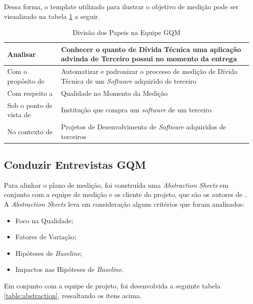 Dessa forma, o template utilizado para ilustrar o objetivo de medição pode ser
visualizado na tabela \ref{table:templateobjetivo} a seguir.
\\

\begin{table}[ht]
\caption{Divisão dos Papeis na Equipe GQM}
\centering
\begin{tabular}{|l|p{7cm}|}
\hline
Analisar & Conhecer o quanto de Dívida Técnica uma aplicação advinda de Terceiro
possui no momento da entrega \\
\hline
Com o propósito de & Automatizar e padronizar o processo de medição de Dívida
Técnica de um \textit{Software} adquirido de terceiro \\
\hline
Com respeito a & Qualidade no Momento da Medição \\
\hline
Sob o ponto de vista de & Institução que compra um \textit{software} de um terceiro  \\
\hline
No contexto de & Projetos de Desenvolvimento de \textit{Software} adquiridos de terceiros \\
\hline
\end{tabular}
\label{table:templateobjetivo}
\end{table}

\subsection{Conduzir Entrevistas GQM}
Para alinhar o plano de medição, foi construída uma \textit{Abstraction Sheets} em conjunto
com a equipe de medição e os cliente do projeto, que são os autores de \cite{td}.
A \textit{Abstraction Sheets} leva em consideração alguns critérios que foram analisados:

\begin{itemize}
  \item Foco na Qualidade;
  \item Fatores de Variação;
  \item Hipóteses de \textit{Baseline};
  \item Impactos nas Hipóteses de \textit{Baseline}.
\end{itemize}

Em conjunto com a equipe de projeto, foi desenvolvida a seguinte tabela
\ref{table:abstraction}, ressaltando
os itens acima.
\\


